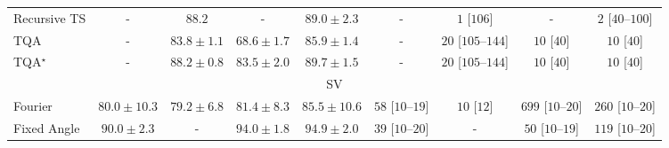 \begin{tabular}{l|cccc|cccc|}
Recursive TS & {\cellcolor[HTML]{000000}} \color[HTML]{F1F1F1} {\cellcolor{white}} \color{black} - & {\cellcolor[HTML]{1E8041}} \color[HTML]{F1F1F1} $88.2$ & {\cellcolor[HTML]{000000}} \color[HTML]{F1F1F1} {\cellcolor{white}} \color{black} - & {\cellcolor[HTML]{177B3F}} \color[HTML]{F1F1F1} $89.0\pm 2.3$ & {\cellcolor[HTML]{000000}} \color[HTML]{F1F1F1} {\cellcolor{white}} \color{black} - & {\cellcolor[HTML]{FFF7F3}} \color[HTML]{000000} $1$ [$106$] & {\cellcolor[HTML]{000000}} \color[HTML]{F1F1F1} {\cellcolor{white}} \color{black} - & {\cellcolor[HTML]{FFF7F3}} \color[HTML]{000000} $2$ [$40$--$100$] \\
TQA & {\cellcolor[HTML]{000000}} \color[HTML]{F1F1F1} {\cellcolor{white}} \color{black} - & {\cellcolor[HTML]{42AB5D}} \color[HTML]{F1F1F1} $83.8\pm 1.1$ & {\cellcolor[HTML]{F6FCB8}} \color[HTML]{000000} $68.6\pm 1.7$ & {\cellcolor[HTML]{30954F}} \color[HTML]{F1F1F1} $85.9\pm 1.4$ & {\cellcolor[HTML]{000000}} \color[HTML]{F1F1F1} {\cellcolor{white}} \color{black} - & {\cellcolor[HTML]{FFF3EF}} \color[HTML]{000000} $20$ [$105$--$144$] & {\cellcolor[HTML]{FFF5F1}} \color[HTML]{000000} $10$ [$40$] & {\cellcolor[HTML]{FFF5F1}} \color[HTML]{000000} $10$ [$40$] \\
TQA$^\star$ & {\cellcolor[HTML]{000000}} \color[HTML]{F1F1F1} {\cellcolor{white}} \color{black} - & {\cellcolor[HTML]{1E8041}} \color[HTML]{F1F1F1} $88.2\pm 0.8$ & {\cellcolor[HTML]{45AD5F}} \color[HTML]{F1F1F1} $83.5\pm 2.0$ & {\cellcolor[HTML]{11753D}} \color[HTML]{F1F1F1} $89.7\pm 1.5$ & {\cellcolor[HTML]{000000}} \color[HTML]{F1F1F1} {\cellcolor{white}} \color{black} - & {\cellcolor[HTML]{FFF3EF}} \color[HTML]{000000} $20$ [$105$--$144$] & {\cellcolor[HTML]{FFF5F1}} \color[HTML]{000000} $10$ [$40$] & {\cellcolor[HTML]{FFF5F1}} \color[HTML]{000000} $10$ [$40$] \\
\cline{1-9}
\multicolumn{9}{c}{\rule{0pt}{8pt}SV} \\
\midrule
Fourier & {\cellcolor[HTML]{73A9CF}} \color[HTML]{F1F1F1} $80.0\pm 10.3$ & {\cellcolor[HTML]{7EADD1}} \color[HTML]{F1F1F1} $79.2\pm 6.8$ & {\cellcolor[HTML]{5C9FC9}} \color[HTML]{F1F1F1} $81.4\pm 8.3$ & {\cellcolor[HTML]{2182B9}} \color[HTML]{F1F1F1} $85.5\pm 10.6$ & {\cellcolor[HTML]{FEE9E5}} \color[HTML]{000000} $58$ [$10$--$19$] & {\cellcolor[HTML]{FFF5F1}} \color[HTML]{000000} $10$ [$12$] & {\cellcolor[HTML]{49006A}} \color[HTML]{F1F1F1} $699$ [$10$--$20$] & {\cellcolor[HTML]{FAA1B6}} \color[HTML]{000000} $260$ [$10$--$20$] \\
Fixed Angle & {\cellcolor[HTML]{04629A}} \color[HTML]{F1F1F1} $90.0\pm 2.3$ & {\cellcolor[HTML]{000000}} \color[HTML]{F1F1F1} {\cellcolor{white}} \color{black} - & {\cellcolor[HTML]{03446A}} \color[HTML]{F1F1F1} $94.0\pm 1.8$ & {\cellcolor[HTML]{023C5F}} \color[HTML]{F1F1F1} $94.9\pm 2.0$ & {\cellcolor[HTML]{FEEEEA}} \color[HTML]{000000} $39$ [$10$--$20$] & {\cellcolor[HTML]{000000}} \color[HTML]{F1F1F1} {\cellcolor{white}} \color{black} - & {\cellcolor[HTML]{FEEBE7}} \color[HTML]{000000} $50$ [$10$--$19$] & {\cellcolor[HTML]{FDD7D3}} \color[HTML]{000000} $119$ [$10$--$20$] \\

\end{tabular}
